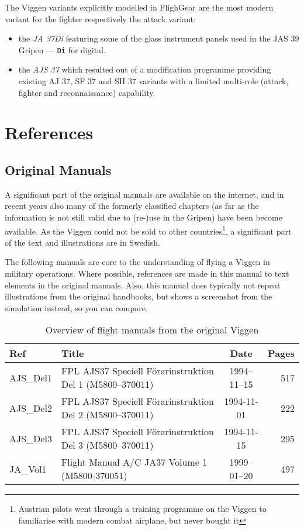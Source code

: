 The Viggen variants explicitly modelled in FlighGear are the most modern variant for the fighter respectively the attack variant:
\begin{itemize}
 \item the \emph{JA 37Di} featuring some of the glass instrument panels used in the JAS 39 Gripen --- \texttt{Di} for digital. 
 \item the \emph{AJS 37} which resulted out of a modification programme providing existing AJ 37, SF 37 and SH 37 variants with a limited multi-role (attack, fighter and reconnaissance) capability.
 \end{itemize} 

\section{References}

\subsection{Original Manuals}
A significant part of the original manuals are available on the internet, and in recent years also many of the formerly classified chapters (as far as the information is not still valid due to (re-)use in the Gripen) have been become available. As the Viggen could not be sold to other countries\footnote{Austrian pilots went through a training programme on the Viggen to familiarise with modern combat airplane, but never bought it}, a significant part of the text and illustrations are in Swedish.

The following manuals are core to the understanding of flying a Viggen in military operations. Where possible, references are made in this manual to text elements in the original manuals. Also, this manual does typically not repeat illustrations from the original handbooks, but shows a screenshot from the simulation instead, so you can compare.

\begin{table}[!th]
\begin{tabular}{|l|l|c|r|}
\hline
Ref & Title & Date & Pages \\
\hline
AJS\_Del1 & FPL AJS37 Speciell Förarinstruktion Del 1 (M5800--370011) & 1994--11--15 & 517 \\
AJS\_Del2 & FPL AJS37 Speciell Förarinstruktion Del 2 (M5800--370011) & 1994-11-01 & 222 \\
AJS\_Del3 & FPL AJS37 Speciell Förarinstruktion Del 3 (M5800--370011) & 1994-11-15 & 295 \\
JA\_Vol1 & Flight Manual A/C JA37 Volume 1 (M5800-370051) & 1999--01--20 & 497 \\
\hline
\end{tabular}
\caption{Overview of flight manuals from the original Viggen}
\end{table}

